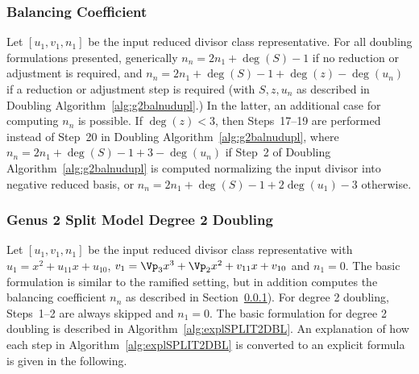 \subsubsection{Balancing Coefficient}\label{sec:expldbl} Let $[u_1,v_1,n_1]$ be
the input reduced divisor class representative. For all doubling formulations
presented, generically $n_n = 2n_1 + \deg(S) - 1$ if no reduction or adjustment
is required, and $n_n = 2n_1 + \deg(S) - 1 + \deg(z) - \deg(u_n)$ if a reduction
or adjustment step is required (with $S,z,u_n$ as described in Doubling
Algorithm~\ref{alg:g2balnudupl}.) In the latter, an additional case for
computing $n_n$ is possible. If $\deg(z) < 3$, then Steps~17--19 are performed
instead of Step~20 in Doubling Algorithm~\ref{alg:g2balnudupl}, where $n_n =
2n_1 + \deg(S) - 1 + 3 - \deg(u_n)$ if Step~2 of Doubling
Algorithm~\ref{alg:g2balnudupl} is computed normalizing the input divisor into
negative reduced basis, or $n_n = 2n_1 + \deg(S) - 1 + 2\deg(u_1) - 3$
otherwise.


\subsubsection{Genus 2 Split Model Degree 2 Doubling}
Let $[u_1,v_1,n_1]$ be the input reduced divisor class representative with $u_1
= x^2 + u_{11}x + u_{10}$, $v_1 = \Vp_3x^3 + \Vp_2x^2 + v_{11}x + v_{10}$ and
$n_1 = 0$. The basic formulation is similar to the ramified setting, but in
addition computes the balancing coefficient $n_n$ as described in
Section~\ref{sec:expldbl}). For degree 2 doubling, Steps~1--2 are always skipped
and $n_1 = 0$. The basic formulation for degree 2 doubling is described in
Algorithm~\ref{alg:explSPLIT2DBL}. An explanation of how each step in
Algorithm~\ref{alg:explSPLIT2DBL} is converted to an explicit formula is given
in the following.

